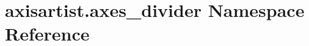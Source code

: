 \hypertarget{namespaceaxisartist_1_1axes__divider}{}\section{axisartist.\+axes\+\_\+divider Namespace Reference}
\label{namespaceaxisartist_1_1axes__divider}

